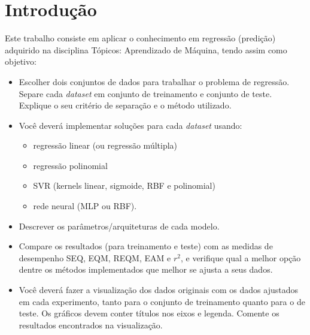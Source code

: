 \chapter{Introdução}\label{cap_intro}

Este trabalho consiste em aplicar o conhecimento em regressão (predição) adquirido na disciplina Tópicos: Aprendizado de Máquina, tendo assim como objetivo:

\begin{itemize}
\item Escolher dois conjuntos de dados para trabalhar o problema de regressão. Separe cada \textit{dataset} em conjunto de treinamento e conjunto de teste. Explique o seu critério de separação e o método utilizado.
\item Você deverá implementar soluções para cada \textit{dataset} usando:
\begin{itemize}
	\item regressão linear (ou regressão múltipla)
	\item regressão polinomial
	\item SVR (kernels linear, sigmoide, RBF e polinomial)
	\item rede neural (MLP ou RBF). 
\end{itemize}

\item Descrever os parâmetros/arquiteturas de cada modelo.
\item Compare os resultados (para treinamento e teste) com as medidas de desempenho SEQ, EQM, REQM, EAM e $r^2$, e verifique qual a melhor opção dentre os métodos implementados que melhor se ajusta a seus dados.
\item Você deverá fazer a visualização dos dados originais com os dados ajustados em cada experimento, tanto para o conjunto de treinamento quanto para o de teste. Os gráficos devem conter títulos nos eixos e legenda. Comente os resultados encontrados na visualização.
\end{itemize}
